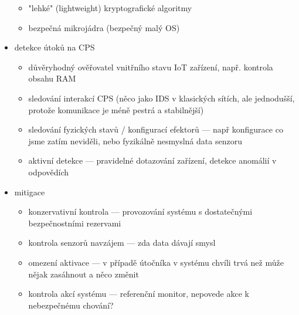 \begin{itemize}
\begin{itemize}
		\item "lehké" (lightweight) kryptografické algoritmy 
		\item bezpečná mikrojádra (bezpečný malý OS)
	\end{itemize}
	\item detekce útoků na CPS
	\begin{itemize}
		\item důvěryhodný ověřovatel vnitřního stavu IoT zařízení, např. kontrola obsahu RAM
		\item sledování interakcí CPS (něco jako IDS v klasických sítích, ale jednodušší, protože komunikace je méně pestrá a stabilnější)
		\item sledování fyzických stavů / konfigurací efektorů --- např konfigurace co jsme zatím neviděli, nebo fyzikálně nesmyslná data senzoru
		\item aktivní detekce --- pravidelné dotazování zařízení, detekce anomálií v odpovědích
	\end{itemize}
	\item mitigace
	\begin{itemize}
		\item konzervativní kontrola --- provozování systému s dostatečnými bezpečnostními rezervami
		\item kontrola senzorů navzájem --- zda data dávají smysl
		\item omezení aktivace --- v případě útočníka v systému chvíli trvá než může nějak zasáhnout a něco změnit
		\item kontrola akcí systému --- referenční monitor, nepovede akce k nebezpečnému chování?
	\end{itemize}
\end{itemize}